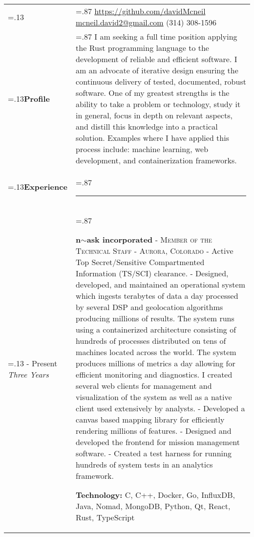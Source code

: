 \documentclass[letterpaper, 10pt]{article}
\newcommand{\timeFrame}[3] {
  \if\relax\detokenize{#2}\relax
    #1
  \else
    #1 - #2
  \fi
  \newline
  \small \textit{#3}
}
\newcommand{\entry}[5] {
  \textbf{#1}
  \if\relax\detokenize{#2}\relax
  \else
       - \textsc{#2}
  \fi
  \if\relax\detokenize{#3}\relax
  \else
      - \textsc{#3}
  \fi
  \newline #4
  \if\relax\detokenize{#5}\relax
  \else
      \newline \textbf{Technology:} #5
  \fi
  \\
}
\newcommand{\horizontalLine}[0] {
    \noindent\rule{.88\linewidth}{0.4pt}
}
\begin{document}

\begin{tabularx}{\linewidth}{>{\hsize=.13\hsize}X>{\hsize=.87\hsize}X}

{\bfseries\Large David McNeil} &
\href{https://github.com/davidMcneil}{https://github.com/davidMcneil}\newline
\href{mailto:mcneil.david2@gmail.com}{mcneil.david2@gmail.com}\newline
(314) 308-1596\\[10pt]

\textbf{Profile} &
{I am seeking a full time position applying the Rust programming language to the development of reliable and efficient software. I am an advocate of iterative design ensuring the continuous delivery of tested, documented, robust software. One of my greatest strengths is the ability to take a problem or technology, study it in general, focus in depth on relevant aspects, and distill this knowledge into a practical solution. Examples where I have applied this process include: machine learning, web development, and containerization frameworks.
} \\

\textbf{Experience} & \horizontalLine \\

\timeFrame{2016}{Present}{Three Years} &
\entry{n$\sim$ask incorporated}
  {Member of the Technical Staff}
  {Aurora, Colorado}
  {
  - Active Top Secret/Sensitive Compartmented Information (TS/SCI) clearance. \newline
  - Designed, developed, and maintained an operational system which ingests terabytes of data a day processed by several DSP and geolocation algorithms producing millions of results. The system runs using a containerized architecture consisting of hundreds of processes distributed on tens of machines located across the world. The system produces millions of metrics a day allowing for efficient monitoring and diagnostics. I created several web clients for management and visualization of the system as well as a native client used extensively by analysts. \newline
  - Developed a canvas based mapping library for efficiently rendering millions of features. \newline
  - Designed and developed the frontend for mission management software. \newline
  - Created a test harness for running hundreds of system tests in an analytics framework.
  }
  {C, C++, Docker, Go, InfluxDB, Java, Nomad, MongoDB, Python, Qt, React, Rust, TypeScript}


\end{tabularx}
\end{document}
